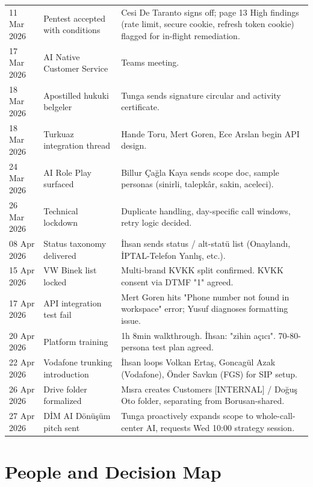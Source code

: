 \documentclass[10pt,a4paper]{article}
\begin{document}
\begin{tabularx}{\linewidth}{@{}L{1.7cm}L{4.0cm}X@{}}
11 Mar 2026 & Pentest accepted with conditions    & Cesi De Taranto signs off; page 13 High findings (rate limit, secure cookie, refresh token cookie) flagged for in-flight remediation. \\
17 Mar 2026 & AI Native Customer Service          & Teams meeting. \\
18 Mar 2026 & Apostilled hukuki belgeler          & Tunga sends signature circular and activity certificate. \\
18 Mar 2026 & Turkuaz integration thread          & Hande Toru, Mert Goren, Ece Arslan begin API design. \\
24 Mar 2026 & AI Role Play surfaced               & Billur Çağla Kaya sends scope doc, sample personas (sinirli, talepkâr, sakin, aceleci). \\
26 Mar 2026 & Technical lockdown                  & Duplicate handling, day-specific call windows, retry logic decided. \\
08 Apr 2026 & Status taxonomy delivered           & İhsan sends status / alt-statü list (Onaylandı, İPTAL-Telefon Yanlış, etc.). \\
15 Apr 2026 & VW Binek list locked                & Multi-brand KVKK split confirmed. KVKK consent via DTMF "1" agreed. \\
17 Apr 2026 & API integration test fail           & Mert Goren hits "Phone number not found in workspace" error; Yusuf diagnoses formatting issue. \\
20 Apr 2026 & Platform training                    & 1h 8min walkthrough. İhsan: "zihin açıcı". 70-80-persona test plan agreed. \\
22 Apr 2026 & Vodafone trunking introduction      & İhsan loops Volkan Ertaş, Goncagül Azak (Vodafone), Önder Savkın (FGS) for SIP setup. \\
26 Apr 2026 & Drive folder formalized              & Mısra creates Customers [INTERNAL] / Doğuş Oto folder, separating from Borusan-shared. \\
27 Apr 2026 & DİM AI Dönüşüm pitch sent           & Tunga proactively expands scope to whole-call-center AI, requests Wed 10:00 strategy session. \\
\bottomrule
\end{tabularx}

\newpage

\section{People and Decision Map}
\end{document}
